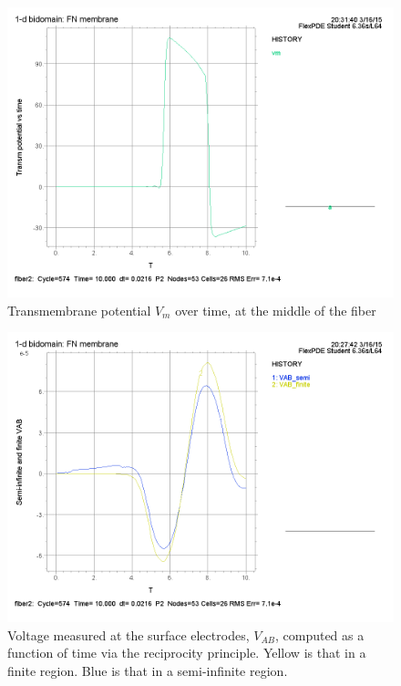 \documentclass{article}
\begin{document}
\begin{figure}[H]
    \begin{center}
        \includegraphics[scale=0.5]{fiber2_Vm.png}
        \caption{Transmembrane potential $V_m$ over time, at the middle of the fiber}
    \end{center}
\end{figure}

\begin{figure}[H]
    \begin{center}
        \includegraphics[scale=0.5]{fiber2_VAB.png}
        \caption{Voltage measured at the surface electrodes, $V_{AB}$, computed as a function of time via the reciprocity principle. Yellow is that in a finite region. Blue is that in a semi-infinite region.}
    \end{center}
\end{figure}
\end{document}
